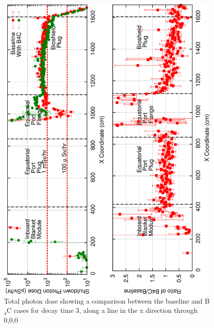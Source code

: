 \documentclass[12pt]{article}
\begin{document}
\begin{figure}[ht!]
\centering
\includegraphics[angle=-90,clip,scale=0.15]{../plots/photon_lineout/dc2_z0_lineout.png}
\caption{Total photon dose showing a comparison between the baseline and B$_4$C cases for decay time 3,
         along a line in the x direction through 0,0,0}
\label{fig:photons_dc3_total_dose_lineout}
\end{figure}
\end{document}
